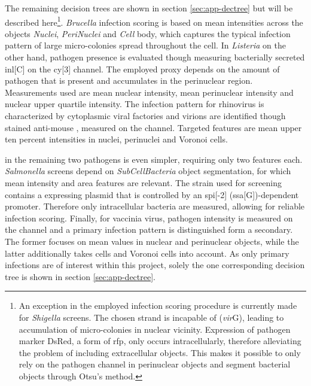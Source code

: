 The remaining decision trees are shown in section \ref{sec:app-dectree} but will be described here\footnote{An exception in the employed infection scoring procedure is currently made for \textit{Shigella} screens. The chosen strand is incapable of  (\textDelta\textit{vir}G), leading to accumulation of micro-colonies in nuclear vicinity. Expression of pathogen marker DsRed, a form of \acrfull{rfp}, only occurs intracellularly, therefore alleviating the problem of including extracellular objects. This makes it possible to only rely on the pathogen channel in perinuclear objects and segment bacterial objects through Otsu's method.}. \textit{Brucella} infection scoring is based on  mean intensities across the objects \textit{Nuclei}, \textit{PeriNuclei} and \textit{Cell} body, which captures the typical infection pattern of large micro-colonies spread throughout the cell. In \textit{Listeria} on the other hand, pathogen presence is evaluated though measuring bacterially secreted \acrshort{inl}[C] on the \acrshort{cy}[3] channel. The employed proxy depends on the amount of pathogen that is present and accumulates in the perinuclear region. Measurements used are mean nuclear intensity, mean perinuclear intensity and nuclear upper quartile intensity. The infection pattern for rhinovirus is characterized by cytoplasmic viral factories and virions are identified though stained anti-mouse , measured on the  channel. Targeted features are mean upper ten percent intensities in nuclei, perinuclei and Voronoi cells.

 in the remaining two pathogens is even simpler, requiring only two features each. \textit{Salmonella} screens depend on \textit{SubCellBacteria} object segmentation, for which mean intensity and area features are relevant. The strain used for screening contains a  expressing plasmid that is controlled by an \acrshort{spi}[-2] (\acrshort{ssa}[G])-dependent promoter. Therefore only intracellular bacteria are measured, allowing for reliable infection scoring. Finally, for vaccinia virus, pathogen intensity is measured on the  channel and a primary infection pattern is distinguished form a secondary. The former focuses on mean values in nuclear and perinuclear objects, while the latter additionally takes cells and Voronoi cells into account. As only primary infections are of interest within this project, solely the one corresponding decision tree is shown in section \ref{sec:app-dectree}.
